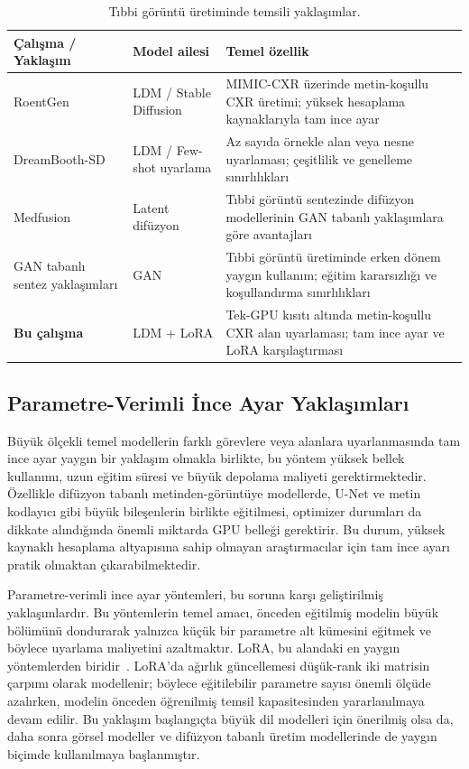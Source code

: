 \documentclass[11pt]{article}
\begin{document}
\begin{table}[htbp]
\centering
\caption{Tıbbi görüntü üretiminde temsili yaklaşımlar.}
\label{tab:prior}
\small
\begin{tabular}{@{}p{}p{}p{}@{}}
\toprule
\textbf{Çalışma / Yaklaşım} & \textbf{Model ailesi} & \textbf{Temel özellik} \\
\midrule
RoentGen~\cite{roentgen} & LDM / Stable Diffusion &
MIMIC-CXR üzerinde metin-koşullu CXR üretimi; yüksek hesaplama kaynaklarıyla tam ince ayar \\

DreamBooth-SD~\cite{dreambooth} & LDM / Few-shot uyarlama &
Az sayıda örnekle alan veya nesne uyarlaması; çeşitlilik ve genelleme sınırlılıkları \\

Medfusion~\cite{medfusion} & Latent difüzyon &
Tıbbi görüntü sentezinde difüzyon modellerinin GAN tabanlı yaklaşımlara göre avantajları \\

GAN tabanlı sentez yaklaşımları & GAN &
Tıbbi görüntü üretiminde erken dönem yaygın kullanım; eğitim kararsızlığı ve koşullandırma sınırlılıkları \\

\textbf{Bu çalışma} & LDM + LoRA &
Tek-GPU kısıtı altında metin-koşullu CXR alan uyarlaması; tam ince ayar ve LoRA karşılaştırması \\
\bottomrule
\end{tabular}
\end{table}

\subsection{Parametre-Verimli İnce Ayar Yaklaşımları}

Büyük ölçekli temel modellerin farklı görevlere veya alanlara uyarlanmasında
tam ince ayar yaygın bir yaklaşım olmakla birlikte, bu yöntem yüksek bellek
kullanımı, uzun eğitim süresi ve büyük depolama maliyeti gerektirmektedir.
Özellikle difüzyon tabanlı metinden-görüntüye modellerde, U-Net ve metin
kodlayıcı gibi büyük bileşenlerin birlikte eğitilmesi, optimizer durumları da
dikkate alındığında önemli miktarda GPU belleği gerektirir. Bu durum,
yüksek kaynaklı hesaplama altyapısına sahip olmayan araştırmacılar için tam
ince ayarı pratik olmaktan çıkarabilmektedir.

Parametre-verimli ince ayar yöntemleri, bu soruna karşı geliştirilmiş
yaklaşımlardır. Bu yöntemlerin temel amacı, önceden eğitilmiş modelin büyük
bölümünü dondurarak yalnızca küçük bir parametre alt kümesini eğitmek ve böylece
uyarlama maliyetini azaltmaktır. LoRA, bu alandaki en yaygın yöntemlerden
biridir~\cite{lora}. LoRA'da ağırlık güncellemesi düşük-rank iki matrisin
çarpımı olarak modellenir; böylece eğitilebilir parametre sayısı önemli ölçüde
azalırken, modelin önceden öğrenilmiş temsil kapasitesinden yararlanılmaya
devam edilir. Bu yaklaşım başlangıçta büyük dil modelleri için önerilmiş olsa
da, daha sonra görsel modeller ve difüzyon tabanlı üretim modellerinde de yaygın
biçimde kullanılmaya başlanmıştır.
\end{document}
